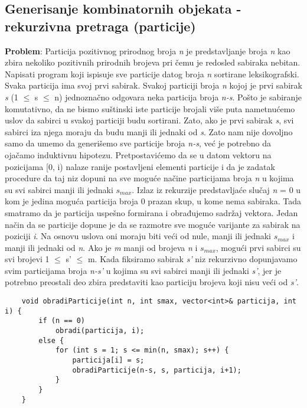 \documentclass{article}
\begin{document}
\subsection{Generisanje kombinatornih objekata - rekurzivna pretraga (particije)}
\textbf{Problem}: Particija pozitivnog prirodnog broja \textit{n} je predstavljanje broja \textit{n} kao
zbira nekoliko pozitivnih prirodnih brojeva pri čemu je redosled sabiraka nebitan. Napisati program koji ispisuje
sve particije datog broja \textit{n} sortirane leksikografski.
\newline
Svaka particija ima svoj prvi sabirak. Svakoj particiji broja \textit{n} kojoj je prvi sabirak \textit{s} (1 $\leq$ s $\leq$ n) jednoznačno odgovara neka particija broja \textit{n-s}.
Pošto je sabiranje komutativno, da ne bismo suštinski iste particije brojali
više puta nametnućemo uslov da sabirci u svakoj particiji budu sortirani. Zato, ako je prvi sabirak \textit{s}, svi sabirci iza njega moraju
da budu manji ili jednaki od \textit{s}. Zato nam nije dovoljno samo da umemo da
generišemo sve particije broja \textit{n-s}, već je potrebno da ojačamo induktivnu
hipotezu. Pretpostavićemo da se u datom vektoru na pozicijama [0, i) nalaze
ranije postavljeni elementi particije i da je zadatak procedure da taj niz dopuni
na sve moguće načine particijama broja \textit{n} u kojima su svi sabirci manji ili jednaki
$s_{max}$. Izlaz iz rekurzije predstavljaće slučaj \textit{n} = 0 u kom je jedina moguća particija
broja 0 prazan skup, u kome nema sabiraka. Tada smatramo da je particija
uspešno formirana i obrađujemo sadržaj vektora.
Jedan način da se particije dopune je da se razmotre sve moguće varijante za
sabirak na poziciji \textit{i}. Na osnovu uslova oni moraju biti veći od nule, manji ili
jednaki $s_{max}$ i manji ili jednaki od \textit{n}. Ako je \textit{m} manji od brojeva
\textit{n} i $s_{max}$, mogući prvi sabirci su svi brojevi 1 $\leq$ s' $\leq$ m. Kada fiksiramo sabirak
\textit{s'} niz rekurzivno dopunjavamo svim particijama broja \textit{n-s'} u kojima su svi
sabirci manji ili jednaki \textit{s'}, jer je potrebno preostali deo zbira predstaviti kao particiju brojeva koji nisu veći od \textit{s'}.
\begin{lstlisting}
    void obradiParticije(int n, int smax, vector<int>& particija, int i) {
        if (n == 0)
            obradi(particija, i);
        else {
            for (int s = 1; s <= min(n, smax); s++) {
                particija[i] = s;
                obradiParticije(n-s, s, particija, i+1);
            }
        }
    }
\end{lstlisting}
\end{document}
